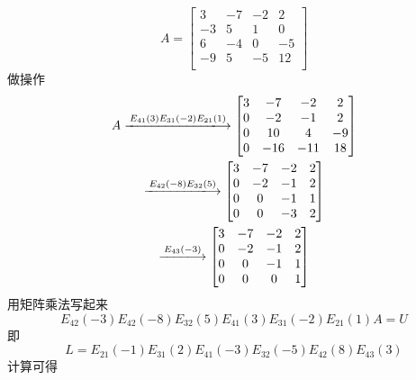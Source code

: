 \begin{example}
    \begin{equation}
      A = \begin{bmatrix}
       3 & -7 & -2 & 2\\
       -3 & 5 & 1 & 0\\
       6 & -4 & 0 & -5\\
       -9 & 5 & -5 & 12\\
      \end{bmatrix}
    \end{equation}
    做操作
    \begin{equation}
        \begin{gathered}
            A \xlongrightarrow{E_{41}(3)E_{31}(-2)E_{21}(1)} 
            \begin{bmatrix}
             3 & -7 & -2 & 2\\
             0 & -2 & -1 & 2\\
             0 & 10 & 4 & -9\\
             0 & -16 & -11 & 18\\
            \end{bmatrix}
            \\
            \xlongrightarrow{E_{42}(-8)E_{32}(5)}
            \begin{bmatrix}
             3 & -7 & -2 & 2\\
             0 & -2 & -1 & 2\\
             0 & 0 & -1 & 1\\
             0 & 0 & -3 & 2\\
            \end{bmatrix}
            \\
            \xlongrightarrow{E_{43}(-3)}
            \begin{bmatrix}
             3 & -7 & -2 & 2\\
             0 & -2 & -1 & 2\\
             0 & 0 & -1 & 1\\
             0 & 0 & 0 & 1\\
            \end{bmatrix}
        \end{gathered}
    \end{equation}
    用矩阵乘法写起来
    \begin{equation}
      E_{42}(-3)E_{42}(-8)E_{32}(5)E_{41}(3)E_{31}(-2)E_{21}(1)A = U
    \end{equation}
    即
    \begin{equation}
      L = E_{21}(-1) E_{31}(2)E_{41}(-3)E_{32}(-5)E_{42}(8)E_{43}(3)
    \end{equation}
    计算可得
\end{example}

